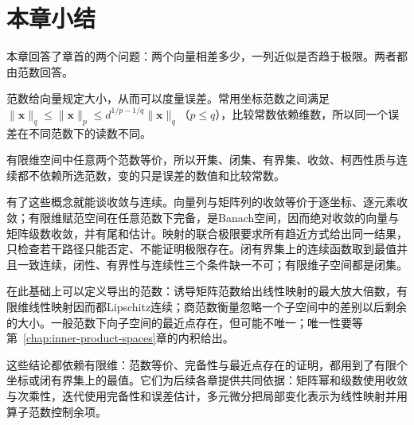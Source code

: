 \section{本章小结}
\label{sec:ls-normed-spaces-summary}
\label{sec:ls-normed-inner-product-summary}

本章回答了章首的两个问题：两个向量相差多少，一列近似是否趋于极限。两者都由范数回答。

范数给向量规定大小，从而可以度量误差。常用坐标范数之间满足$\lVert\bm x\rVert_q\leq\lVert\bm x\rVert_p\leq d^{1/p-1/q}\lVert\bm x\rVert_q$（$p\leq q$），比较常数依赖维数，所以同一个误差在不同范数下的读数不同。

有限维空间中任意两个范数等价，所以开集、闭集、有界集、收敛、柯西性质与连续都不依赖所选范数，变的只是误差的数值和比较常数。

有了这些概念就能谈收敛与连续。向量列与矩阵列的收敛等价于逐坐标、逐元素收敛；有限维赋范空间在任意范数下完备，是Banach空间，因而绝对收敛的向量与矩阵级数收敛，并有尾和估计。映射的联合极限要求所有趋近方式给出同一结果，只检查若干路径只能否定、不能证明极限存在。闭有界集上的连续函数取到最值并且一致连续，闭性、有界性与连续性三个条件缺一不可；有限维子空间都是闭集。

在此基础上可以定义导出的范数：诱导矩阵范数给出线性映射的最大放大倍数，有限维线性映射因而都Lipschitz连续；商范数衡量忽略一个子空间中的差别以后剩余的大小。一般范数下向子空间的最近点存在，但可能不唯一；唯一性要等第~\ref{chap:inner-product-spaces}章的内积给出。

这些结论都依赖有限维：范数等价、完备性与最近点存在的证明，都用到了有限个坐标或闭有界集上的最值。它们为后续各章提供共同依据：矩阵幂和级数使用收敛与次乘性，迭代使用完备性和误差估计，多元微分把局部变化表示为线性映射并用算子范数控制余项。
